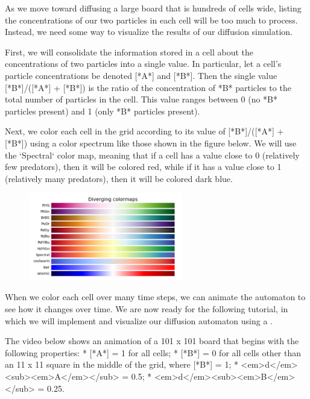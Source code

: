 {{As we move toward diffusing a large board that is hundreds of cells wide, listing the concentrations of our two particles in each cell will be too much to process. Instead, we need some way to visualize the results of our diffusion simulation.

First, we will consolidate the information stored in a cell about the concentrations of two particles into a single value. In particular, let a cell's particle concentrations be denoted [*A*] and [*B*]. Then the single value [*B*]/([*A*] + [*B*]) is the ratio of the concentration of *B* particles to the total number of particles in the cell. This value ranges between 0 (no *B* particles present) and 1 (only *B* particles present).

Next, we color each cell in the grid according to its value of [*B*]/([*A*] + [*B*]) using a color spectrum like those shown in the figure below. We will use the `Spectral` color map, meaning that if a cell has a value close to 0 (relatively few predators), then it will be colored red, while if it has a value close to 1 (relatively many predators), then it will be colored dark blue.

\begin{figure}[h]
\centering
\mySfFamily
\includegraphics[width = 0.6\textwidth]{../assets/images/600px/matplotlib_colormap.png}
\caption{}
\label{fig:matplotlib_colormap}
\end{figure}

When we color each cell over many time steps, we can animate the automaton to see how it changes over time. We are now ready for the following tutorial, in which we will implement and visualize our diffusion automaton using a .


The video below shows an animation of a 101 x 101 board that begins with the following properties:
* [*A*] = 1 for all cells;
* [*B*] = 0 for all cells other than an 11 x 11 square in the middle of the grid, where [*B*] = 1;
* <em>d</em><sub><em>A</em></sub> = 0.5;
* <em>d</em><sub><em>B</em></sub> = 0.25.

}}

